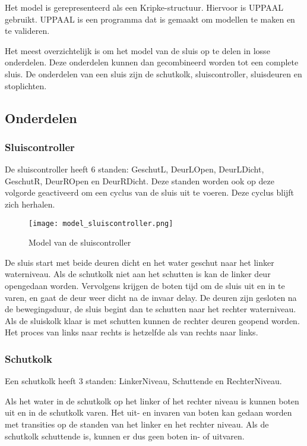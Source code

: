 \documentclass[../verslag.tex]{subfiles}
\begin{document}
Het model is gerepresenteerd als een Kripke-structuur. Hiervoor is UPPAAL gebruikt. UPPAAL is een programma dat is gemaakt om modellen te maken en te valideren.

Het meest overzichtelijk is om het model van de sluis op te delen in losse onderdelen. Deze onderdelen kunnen dan gecombineerd worden tot een complete sluis. De onderdelen van een sluis zijn de schutkolk, sluiscontroller, sluisdeuren en stoplichten.




\subsection{Onderdelen} 

\subsubsection{Sluiscontroller}
De sluiscontroller heeft 6 standen: GeschutL, DeurLOpen, DeurLDicht, GeschutR, DeurROpen en DeurRDicht.
Deze standen worden ook op deze volgorde geactiveerd om een cyclus van de sluis uit te voeren. Deze cyclus blijft zich herhalen.
\begin{figure}[H]
    \centering
    \texttt{[image: model\_sluiscontroller.png]}
    \caption{Model van de sluiscontroller}
\end{figure}

De sluis start met beide deuren dicht en het water geschut naar het linker waterniveau. Als de schutkolk niet aan het schutten is kan de linker deur opengedaan worden. Vervolgens krijgen de boten tijd om de sluis uit en in te varen, en gaat de deur weer dicht na de invaar delay. De deuren zijn gesloten na de bewegingsduur, de sluis begint dan te schutten naar het rechter waterniveau. Als de sluiskolk klaar is met schutten kunnen de rechter deuren geopend worden. Het proces van links naar rechts is hetzelfde als van rechts naar links.




\subsubsection{Schutkolk}
Een schutkolk heeft 3 standen: LinkerNiveau, Schuttende en RechterNiveau.

Als het water in de schutkolk op het linker of het rechter niveau is kunnen boten uit en in de schutkolk varen. Het uit- en invaren van boten kan gedaan worden met transities op de standen van het linker en het rechter niveau. Als de schutkolk schuttende is, kunnen er dus geen boten in- of uitvaren.
\end{document}
